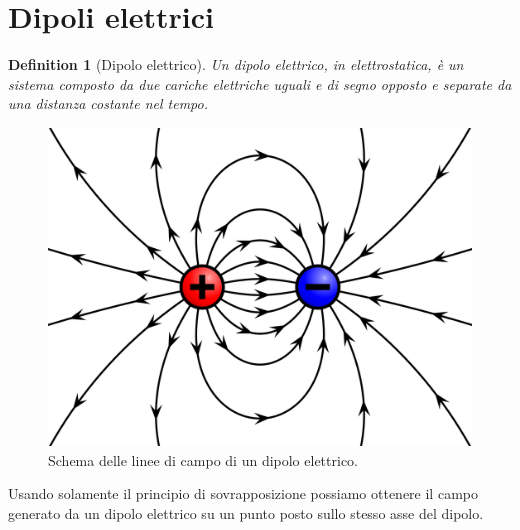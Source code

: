 \documentclass[10pt,a4paper]{article}
\newtheorem{definition}{Definition}
\begin{document}
\section{Dipoli elettrici}
\begin{definition}[Dipolo elettrico]
	Un dipolo elettrico, in elettrostatica, è un sistema composto da due cariche elettriche uguali e di segno opposto e separate da una distanza costante nel tempo.
\end{definition}
\begin{figure}[h!]
	\centering
	\includegraphics[width=0.4\linewidth]{images/dipolo_elettrico}
	\caption{Schema delle linee di campo di un dipolo elettrico.}
	\label{fig:dipoloelettrico}
\end{figure}
\FloatBarrier
Usando solamente il principio di sovrapposizione possiamo ottenere il campo generato da un dipolo elettrico su un punto posto sullo stesso asse del dipolo.
\end{document}
